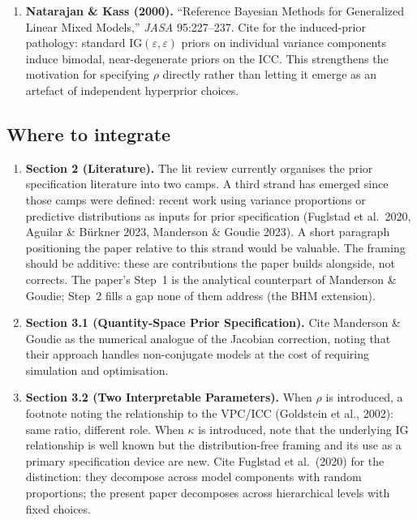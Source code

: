 \documentclass[12pt,a4paper]{article}
\newcommand{\IG}{\mathrm{IG}}
\begin{document}
\begin{enumerate}
  \item \textbf{Natarajan \& Kass (2000).} ``Reference Bayesian Methods for
    Generalized Linear Mixed Models,'' \emph{JASA} 95:227--237. Cite for the
    induced-prior pathology: standard $\IG(\varepsilon, \varepsilon)$ priors on
    individual variance components induce bimodal, near-degenerate priors on
    the ICC. This strengthens the motivation for specifying $\rho$ directly
    rather than letting it emerge as an artefact of independent hyperprior
    choices.
\end{enumerate}

\subsection{Where to integrate}

\begin{enumerate}
  \item \textbf{Section 2 (Literature).} The lit review currently organises the
    prior specification literature into two camps. A third strand has emerged
    since those camps were defined: recent work using variance proportions or
    predictive distributions as inputs for prior specification (Fuglstad et al.\
    2020, Aguilar \& B\"{u}rkner 2023, Manderson \& Goudie 2023). A short
    paragraph positioning the paper relative to this strand would be valuable.
    The framing should be additive: these are contributions the paper builds
    alongside, not corrects. The paper's Step~1 is the analytical counterpart
    of Manderson \& Goudie; Step~2 fills a gap none of them address (the BHM
    extension).

  \item \textbf{Section 3.1 (Quantity-Space Prior Specification).} Cite
    Manderson \& Goudie as the numerical analogue of the Jacobian correction,
    noting that their approach handles non-conjugate models at the cost of
    requiring simulation and optimisation.

  \item \textbf{Section 3.2 (Two Interpretable Parameters).} When $\rho$ is
    introduced, a footnote noting the relationship to the VPC/ICC (Goldstein et
    al., 2002): same ratio, different role. When $\kappa$ is introduced, note
    that the underlying IG relationship is well known but the distribution-free
    framing and its use as a primary specification device are new. Cite
    Fuglstad et al.\ (2020) for the distinction: they decompose across model
    components with random proportions; the present paper decomposes across
    hierarchical levels with fixed choices.


\end{enumerate}
\end{document}
